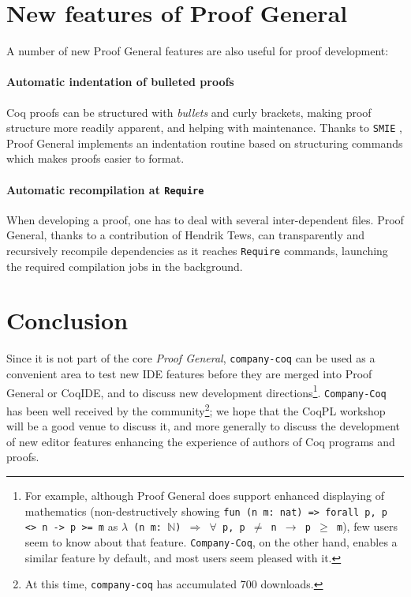 \documentclass[preprint]{sigplanconf}
\newcommand{\proofg}{Proof General\xspace}
\begin{document}
\section*{New features of \proofg}

A number of new \proofg features are also useful for proof development:

\paragraph{Automatic indentation of bulleted proofs} Coq proofs can be structured with \emph{bullets} and curly brackets, making proof structure more readily apparent, and helping with maintenance. Thanks to \texttt{SMIE} \cite{SMIE}, \proofg implements an indentation routine based on structuring commands which makes proofs easier to format.

\paragraph{Automatic recompilation at \texttt{Require}} When developing a proof, one has to deal with several inter-dependent files. \proofg, thanks to a contribution of Hendrik Tews, can transparently and recursively recompile dependencies as it reaches \texttt{Require} commands, launching the required compilation jobs in the background.


\section*{Conclusion}
Since it is not part of the core \emph{\proofg}, \texttt{company-coq} can be used as a convenient area to test new IDE features before they are merged into \proofg or CoqIDE, and to discuss new development directions\footnote{For example, although \proofg does support enhanced displaying of mathematics (non-destructively showing \texttt{fun (n m: nat) => forall p, p <> n -> p >= m} as \texttt{$\lambda$ (n m: $\mathbb N$) $\Rightarrow$ $\forall$ p, p $\neq$ n $\rightarrow$ p $\geq$ m}), few users seem to know about that feature. \texttt{Company-Coq}, on the other hand, enables a similar feature by default, and most users seem pleased with it.}. \texttt{Company-Coq} has been well received by the community\footnote{At this time, \texttt{company-coq} has accumulated 700 downloads.}; we hope that the CoqPL workshop will be a good venue to discuss it, and more generally to discuss the development of new editor features enhancing the experience of authors of Coq programs and proofs.



\end{document}
